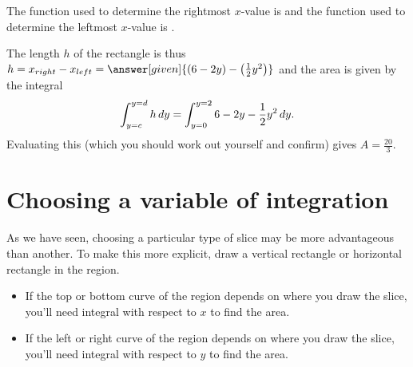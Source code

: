 \documentclass{ximera}
\begin{document}
\begin{example}
\begin{explanation}
\begin{image}
            \end{image}
            
            
The function used to determine the rightmost $x$-value is  and the function used to determine the leftmost $x$-value is .

The length $h$ of the rectangle is thus $h=x_{right}-x_{left} = \answer[given]{(6-2y)-\left(\frac{1}{2}y^2\right)}$ and the area is given by the integral
  \[
 \int_{y=c}^{y=d} h \mathop{}\!d y =  \int_{y=0}^{y=2} 6-2y-\frac{1}{2}y^2 \mathop{}\!d y .
  \]
  Evaluating this (which you should work out yourself and confirm) gives $A= \frac{20}{3}.$
 \end{explanation}
 
\end{example}

\section{Choosing a variable of integration}
As we have seen, choosing a particular type of slice may be more advantageous than another.  To make this more explicit, draw a vertical rectangle or horizontal rectangle in the region. 

\begin{itemize}
\item If the top or bottom curve of the region depends on where you draw the slice, you'll need  integral with respect to $x$ to find the area.
\item If the left or right curve of the region depends on where you draw the slice, you'll need  integral with respect to $y$ to find the area.
\end{itemize}
\end{document}

